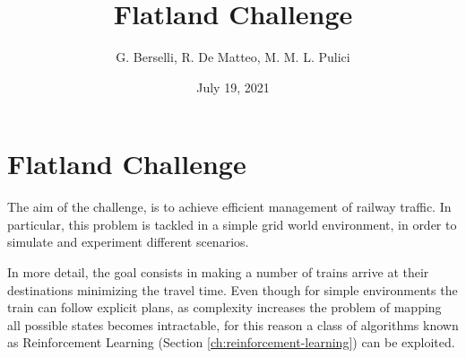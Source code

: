 \documentclass[a4paper, 12pt]{article}
\numberwithin{equation}{section}
\begin{document}
\title{Flatland Challenge}
\author{G. Berselli, R. De Matteo, M. M. L. Pulici}
\date{July 19, 2021}
\maketitle
\begin{center}
\end{center}


\clearpage

\tableofcontents

\clearpage


\section[Flatland Challenge]{Flatland Challenge \cite{flatland}}

The aim of the challenge, is to achieve efficient management of railway traffic. In particular, this problem is tackled in a simple grid world environment, in order to simulate and experiment different scenarios.

In more detail, the goal consists in making a number of trains arrive at their destinations minimizing the travel time. Even though for simple environments the train can follow explicit plans, as complexity increases the problem of mapping all possible states becomes intractable, for this reason a class of algorithms known as Reinforcement Learning (Section \ref{ch:reinforcement-learning}) can be exploited.
\end{document}
